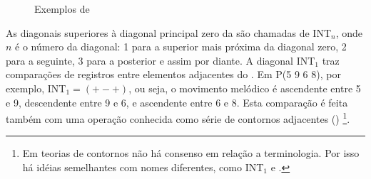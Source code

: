 \begin{figure}
  \centering
  \qquad
  \qquad
  \caption{Exemplos de }
  \label{fig:matriz-exemplos}
\end{figure}

As diagonais superiores à diagonal principal zero da 
são chamadas de INT$_n$, onde $n$ é o número da diagonal: 1 para a
superior mais próxima da diagonal zero, 2 para a seguinte, 3 para a
posterior e assim por diante. 
A diagonal INT$_1$ traz comparações de registros entre elementos
adjacentes do . Em P(5 9 6 8), por exemplo, INT$_1=(+ - +)$,
ou seja, o movimento melódico é ascendente entre 5 e 9, descendente
entre 9 e 6, e ascendente entre 6 e 8. Esta comparação é feita também
com uma operação conhecida como série de contornos adjacentes
() \footnote{Em teorias de contornos não há consenso em
  relação a terminologia. Por isso há idéias semelhantes com nomes
  diferentes, como INT$_1$ e  \cite{friedmann87:response}.}.

